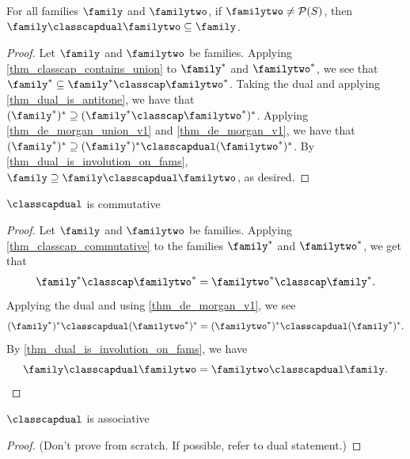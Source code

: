 \begin{theorem}
    \label{thm_classcapdual_contained_in_intersection}
     For all families $\family$ and $\familytwo$, if $\familytwo \neq \mathcal{P}(S)$, then $\family \classcapdual \familytwo \subseteq \family$.
\end{theorem}

\begin{proof}
     Let $\family$ and $\familytwo$ be families.  Applying \cref{thm_classcap_contains_union} to $\family^*$ and $\familytwo^*$, we see that $\family^* \subseteq \family^* \classcap \familytwo^*$. Taking the dual and applying \cref{thm_dual_is_antitone}, we have that $(\family^*)^* \supseteq (\family^* \classcap \familytwo^*)^*$.  Applying \cref{thm_de_morgan_union_v1} and \cref{thm_de_morgan_v1}, we have that $(\family^*)^* \supseteq (\family^*)^* \classcapdual (\familytwo^*)^*$.  By \cref{thm_dual_is_involution_on_fams}, $\family \supseteq \family \classcapdual \familytwo$, as desired.
\end{proof}

\begin{theorem}
    \label{thm_classcapdual_commutative}
    $\classcapdual$ is commutative
\end{theorem}


\begin{proof}
    Let $\family$ and $\familytwo$ be families.  Applying \cref{thm_classcap_commutative} to the families $\family^*$ and $\familytwo^*$, we get that
    \[\family^* \classcap \familytwo^* = \familytwo^* \classcap \family^*.\]
    Applying the dual and using \cref{thm_de_morgan_v1}, we see
    \[(\family^*)^* \classcapdual (\familytwo^*)^* = (\familytwo^*)^* \classcapdual (\family^*)^*.\]
    By \cref{thm_dual_is_involution_on_fams}, we have
    \[\family \classcapdual \familytwo = \familytwo \classcapdual \family.\]
\end{proof}

\begin{theorem}
    \label{thm_classcapdual_associative}
    $\classcapdual$ is associative
\end{theorem}

\begin{proof}
    (Don't prove from scratch.  If possible, refer to dual statement.)
\end{proof}

